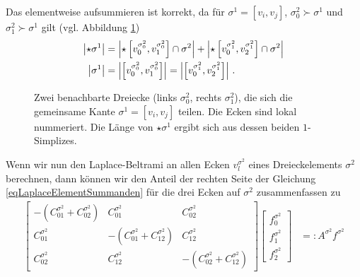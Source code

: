     Das elementweise aufsummieren ist korrekt, da für \( \sigma^{1}=\left[ v_{i}, v_{j} \right]\),
    \( \sigma^{2}_{0}\succ\sigma^{1} \) und \( \sigma^{2}_{1}\succ\sigma^{1} \) gilt
    (vgl. Abbildung \ref{figLokaleNummerierung})
    \begin{align}
      \left| \star\sigma^{1} \right| 
        &= \left| \star \left[ v^{\sigma^{2}_{0}}_{0}, v^{\sigma^{2}_{0}}_{1} \right] \cap \sigma^{2}\right|
         + \left| \star \left[ v^{\sigma^{2}_{1}}_{0}, v^{\sigma^{2}_{1}}_{2} \right] \cap \sigma^{2}\right| \\
      \left| \sigma^{1} \right| 
          &= \left|  \left[ v^{\sigma^{2}_{0}}_{0}, v^{\sigma^{2}_{0}}_{1} \right] \right|
           = \left|  \left[ v^{\sigma^{2}_{1}}_{0}, v^{\sigma^{2}_{1}}_{2} \right] \right| \,\text{.}
    \end{align}
    \begin{figure}
      \centering
      \caption[lokale Nummerierung]{Zwei benachbarte Dreiecke (links \( \sigma^{2}_{0} \), rechts \(
          \sigma^{2}_{1} \)), die sich die gemeinsame Kante \( \sigma^{1}=\left[ v_{i}, v_{j} \right] \) teilen.
          Die Ecken sind lokal nummeriert.
          Die Länge von \( \star\sigma^{1} \) ergibt sich aus dessen beiden \( 1 \)-Simplizes.}
      \label{figLokaleNummerierung}
    \end{figure}
    Wenn wir nun den Laplace-Beltrami an allen Ecken \( v^{\sigma^{2}}_{l} \) eines Dreieckelements 
    \( \sigma^{2} \) berechnen, dann können wir den Anteil der rechten Seite
    der Gleichung \eqref{eqLaplaceElementSummanden}
    für die drei Ecken auf \( \sigma^{2} \) zusammenfassen zu
    \begin{align}
      \begin{bmatrix}
        -\left( C^{\sigma^{2}}_{01} + C^{\sigma^{2}}_{02}\right) & C^{\sigma^{2}}_{01} & C^{\sigma^{2}}_{02} \\
        C^{\sigma^{2}}_{01} & -\left( C^{\sigma^{2}}_{01} + C^{\sigma^{2}}_{12}\right) & C^{\sigma^{2}}_{12} \\
        C^{\sigma^{2}}_{02} & C^{\sigma^{2}}_{12} & -\left( C^{\sigma^{2}}_{02} + C^{\sigma^{2}}_{12}\right)
      \end{bmatrix}
      \begin{bmatrix}
        f^{\sigma^{2}}_{0} \\ f^{\sigma^{2}}_{1} \\ f^{\sigma^{2}}_{2}
      \end{bmatrix}
        &=: A^{\sigma^{2}} f^{\sigma^{2}}
    \end{align}
